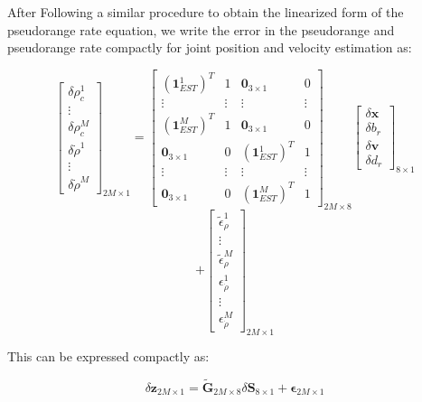 \documentclass[conference]{IEEEtran}
\begin{document}
After Following a similar procedure to obtain the linearized form of the pseudorange rate equation, we write the error in the pseudorange and pseudorange rate compactly for joint position and velocity estimation as:

\begin{equation}
\begin{bmatrix}
\delta \rho_c^1 \\
\vdots \\
\delta \rho_c^M \\
\delta \dot{\rho}^1 \\
\vdots \\
\delta \dot{\rho}^M
\end{bmatrix}_{2M \times 1} =
\begin{bmatrix}
(\mathbf{1}_{EST}^1)^T & 1 & \mathbf{0}_{3 \times 1} & 0 \\
\vdots & \vdots & \vdots & \vdots \\
(\mathbf{1}_{EST}^M)^T & 1 & \mathbf{0}_{3 \times 1} & 0 \\
\mathbf{0}_{3 \times 1} & 0 & (\mathbf{1}_{EST}^1)^T & 1 \\
\vdots & \vdots & \vdots & \vdots \\
\mathbf{0}_{3 \times 1} & 0 & (\mathbf{1}_{EST}^M)^T & 1
\end{bmatrix}_{2M \times 8}
\begin{bmatrix}
\delta \mathbf{x} \\
\delta b_r \\
\delta \mathbf{v} \\
\delta d_r
\end{bmatrix}_{8 \times 1}
\end{equation}
\[
+ \begin{bmatrix}
\tilde{\epsilon}_\rho^1 \\
\vdots \\
\tilde{\epsilon}_\rho^M \\
\epsilon_{\dot{\rho}}^1 \\
\vdots \\
\epsilon_{\dot{\rho}}^M
\end{bmatrix}_{2M \times 1}
\]

This can be expressed compactly as:

\begin{equation}
\delta \mathbf{z}_{2M \times 1} = \tilde{\mathbf{G}}_{2M \times 8} \delta \mathbf{S}_{8 \times 1} + \boldsymbol{\epsilon}_{2M \times 1}
\end{equation}
\end{document}
